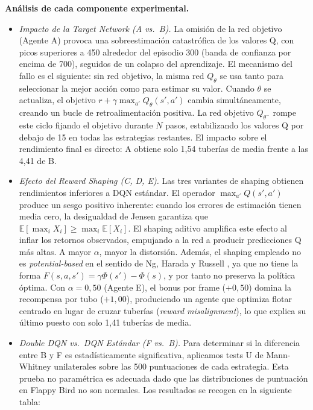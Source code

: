 \textbf{Análisis de cada componente experimental.}

\begin{itemize}

    \item \textit{Impacto de la Target Network (A vs.\ B).} La omisión de la red objetivo (Agente A) provoca una sobreestimación catastrófica de los valores Q, con picos superiores a 450 alrededor del episodio 300 (banda de confianza por encima de 700), seguidos de un colapso del aprendizaje. El mecanismo del fallo es el siguiente: sin red objetivo, la misma red $Q_\theta$ se usa tanto para seleccionar la mejor acción como para estimar su valor. Cuando $\theta$ se actualiza, el objetivo $r + \gamma \max_{a'} Q_\theta(s', a')$ cambia simultáneamente, creando un bucle de retroalimentación positiva. La red objetivo $Q_{\theta^-}$ rompe este ciclo fijando el objetivo durante $N$ pasos, estabilizando los valores Q por debajo de 15 en todas las estrategias restantes. El impacto sobre el rendimiento final es directo: A obtiene solo 1{,}54 tuberías de media frente a las 4{,}41 de B.

    \item \textit{Efecto del Reward Shaping (C, D, E).} Las tres variantes de shaping obtienen rendimientos inferiores a DQN estándar. El operador $\max_{a'} Q(s', a')$ produce un sesgo positivo inherente: cuando los errores de estimación tienen media cero, la desigualdad de Jensen garantiza que $\mathbb{E}[\max_i X_i] \geq \max_i \mathbb{E}[X_i]$. El shaping aditivo amplifica este efecto al inflar los retornos observados, empujando a la red a producir predicciones Q más altas. A mayor $\alpha$, mayor la distorsión. Además, el shaping empleado no es \textit{potential-based} en el sentido de Ng, Harada y Russell \cite{ng1999policy}, ya que no tiene la forma $F(s, a, s') = \gamma \Phi(s') - \Phi(s)$, y por tanto no preserva la política óptima. Con $\alpha = 0{,}50$ (Agente E), el bonus por frame ($+0{,}50$) domina la recompensa por tubo ($+1{,}00$), produciendo un agente que optimiza flotar centrado en lugar de cruzar tuberías (\textit{reward misalignment}), lo que explica su último puesto con solo 1{,}41 tuberías de media.

    \item \textit{Double DQN vs.\ DQN Estándar (F vs.\ B).} Para determinar si la diferencia entre B y F es estadísticamente significativa, aplicamos tests U de Mann-Whitney unilaterales sobre las 500 puntuaciones de cada estrategia. Esta prueba no paramétrica es adecuada dado que las distribuciones de puntuación en Flappy Bird no son normales. Los resultados se recogen en la siguiente tabla:
\end{itemize}

